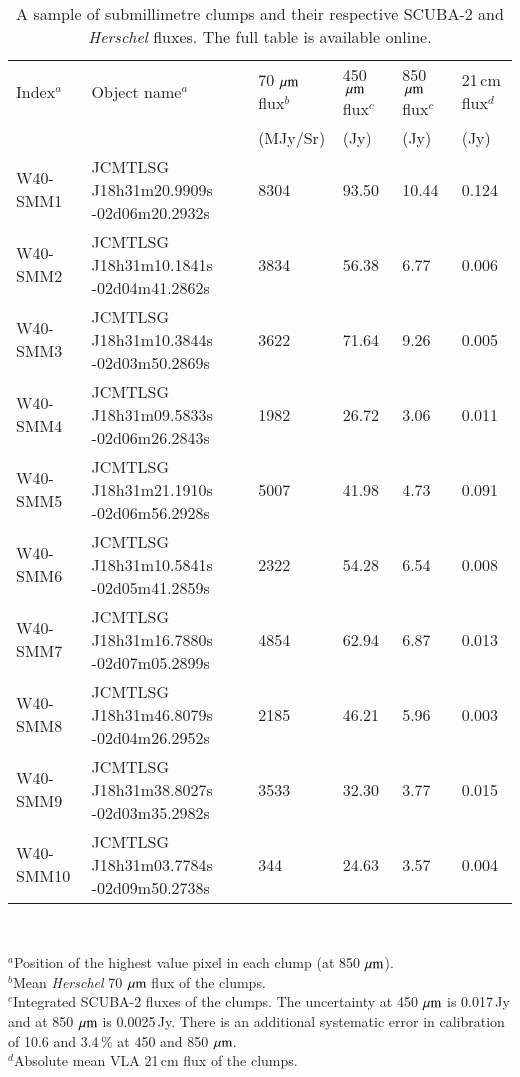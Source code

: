 \begin{table*}%
\caption{A sample of submillimetre clumps and their respective SCUBA-2 and \emph{Herschel} fluxes. The full table is available online.}
\begin{tabular}{@{}llllll}
Index$^{a}$	&	Object name$^{a}$	&	70\,$\,\mu\rm{m}$ flux$^{b}$&		450\,$\,\mu\rm{m}$ flux$^{c}$	&	850\,$\,\mu\rm{m}$ flux$^{c}$	&	21\,cm flux$^{d}$\\
	&		&	(MJy/Sr)&		(Jy)	&	(Jy)	&	(Jy)\\
\hline
\hline
W40-SMM1	&	JCMTLSG J18h31m20.9909s -02d06m20.2932s	&	8304		&	93.50	&	10.44	&	0.124\\
W40-SMM2	&	JCMTLSG J18h31m10.1841s -02d04m41.2862s	&	3834		&	56.38	&	6.77	&	0.006\\
W40-SMM3	&	JCMTLSG J18h31m10.3844s -02d03m50.2869s	&	3622		&	71.64	&	9.26	&	0.005\\
W40-SMM4	&	JCMTLSG J18h31m09.5833s -02d06m26.2843s	&	1982		&	26.72	&	3.06	&	0.011\\
W40-SMM5	&	JCMTLSG J18h31m21.1910s -02d06m56.2928s	&	5007		&	41.98	&	4.73	&	0.091\\
W40-SMM6	&	JCMTLSG J18h31m10.5841s -02d05m41.2859s	&	2322		&	54.28	&	6.54	&	0.008\\
W40-SMM7	&	JCMTLSG J18h31m16.7880s -02d07m05.2899s	&	4854		&	62.94	&	6.87	&	0.013\\
W40-SMM8	&	JCMTLSG J18h31m46.8079s -02d04m26.2952s	&	2185		&	46.21	&	5.96	&	0.003\\
W40-SMM9	&	JCMTLSG J18h31m38.8027s -02d03m35.2982s	&	3533		&	32.30	&	3.77	&	0.015\\
W40-SMM10	&	JCMTLSG J18h31m03.7784s -02d09m50.2738s	&	344		&	24.63	&	3.57	&	0.004\\
\hline
\end{tabular}\\
\raggedright
$^{a}$Position of the highest value pixel in each clump (at 850\,$\,\mu\rm{m}$). \\
$^{b}$Mean \emph{Herschel} 70\,$\,\mu\rm{m}$ flux of the clumps.\\
$^{c}$Integrated SCUBA-2 fluxes of the clumps. The uncertainty at 450\,$\,\mu\rm{m}$ is 0.017\,Jy and at 850\,$\,\mu\rm{m}$ is 0.0025\,Jy. There is an additional systematic error in calibration of 10.6 and 3.4\,\% at 450 and 850\,$\,\mu\rm{m}$.\\
$^{d}$Absolute mean VLA 21\,cm flux of the clumps.\\
\label{tab:results1}
\end{table*}%



